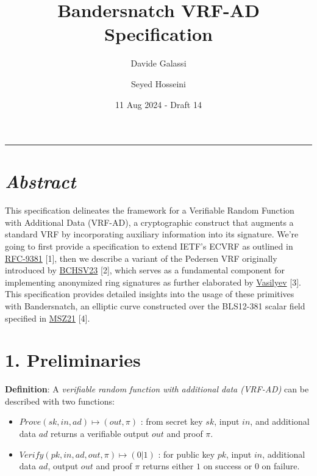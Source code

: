 \documentclass[
]{article}
\title{Bandersnatch VRF-AD Specification}
\author{Davide Galassi \and Seyed Hosseini}
\date{11 Aug 2024 - Draft 14}
\begin{document}
\maketitle

\newcommand{\G}{\langle G \rangle}
\newcommand{\F}{\mathbb{Z}^*_r}

\begin{center}\rule{0.5\linewidth}{0.5pt}\end{center}

\hypertarget{abstract}{%
\section{\texorpdfstring{\emph{Abstract}}{Abstract}}\label{abstract}}

This specification delineates the framework for a Verifiable Random
Function with Additional Data (VRF-AD), a cryptographic construct that
augments a standard VRF by incorporating auxiliary information into its
signature. We're going to first provide a specification to extend IETF's
ECVRF as outlined in
\href{https://datatracker.ietf.org/doc/rfc9381}{RFC-9381} {[}1{]}, then
we describe a variant of the Pedersen VRF originally introduced by
\href{https://eprint.iacr.org/2023/002}{BCHSV23} {[}2{]}, which serves
as a fundamental component for implementing anonymized ring signatures
as further elaborated by
\href{https://hackmd.io/ulW5nFFpTwClHsD0kusJAA}{Vasilyev} {[}3{]}. This
specification provides detailed insights into the usage of these
primitives with Bandersnatch, an elliptic curve constructed over the
BLS12-381 scalar field specified in
\href{https://eprint.iacr.org/2021/1152}{MSZ21} {[}4{]}.

\hypertarget{preliminaries}{%
\section{1. Preliminaries}\label{preliminaries}}

\textbf{Definition}: A \emph{verifiable random function with additional
data (VRF-AD)} can be described with two functions:

\begin{itemize}
\item
  \(Prove(sk,in,ad) \mapsto (out,\pi)\) : from secret key \(sk\), input
  \(in\), and additional data \(ad\) returns a verifiable output \(out\)
  and proof \(\pi\).
\item
  \(Verify(pk,in,ad,out,\pi) \mapsto (0|1)\) : for public key \(pk\),
  input \(in\), additional data \(ad\), output \(out\) and proof \(\pi\)
  returns either \(1\) on success or \(0\) on failure.
\end{itemize}
\end{document}
